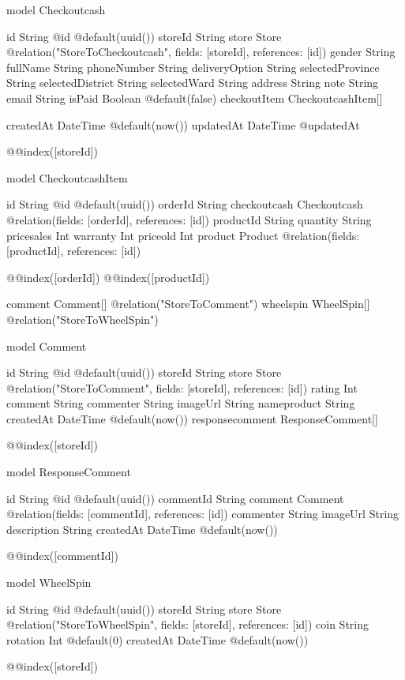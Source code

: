 model Checkoutcash {
  id               String             @id @default(uuid())
  storeId          String
  store            Store              @relation("StoreToCheckoutcash", fields: [storeId], references: [id])
  gender           String
  fullName         String
  phoneNumber      String
  deliveryOption   String
  selectedProvince String
  selectedDistrict String
  selectedWard     String
  address          String
  note             String
  email            String
  isPaid           Boolean            @default(false)
  checkoutItem     CheckoutcashItem[]

  createdAt DateTime @default(now())
  updatedAt DateTime @updatedAt

  @@index([storeId])
}

model CheckoutcashItem {
  id           String       @id @default(uuid())
  orderId      String
  checkoutcash Checkoutcash @relation(fields: [orderId], references: [id])
  productId    String
  quantity     String
  pricesales   Int
  warranty     Int
  priceold     Int
  product      Product      @relation(fields: [productId], references: [id])

  @@index([orderId])
  @@index([productId])
}



comment Comment[] @relation("StoreToComment")
wheelspin WheelSpin[] @relation("StoreToWheelSpin")





model Comment {
  id               String            @id @default(uuid())
  storeId         String
  store           Store         @relation("StoreToComment", fields: [storeId], references: [id])
  rating           Int
  comment          String
  commenter        String
  imageUrl         String
  nameproduct      String
  createdAt        DateTime          @default(now())
  responsecomment  ResponseComment[]

  @@index([storeId])
}

model ResponseComment {
  id          String   @id @default(uuid())
  commentId   String
  comment     Comment  @relation(fields: [commentId], references: [id])
  commenter   String
  imageUrl    String
  description String
  createdAt   DateTime @default(now())

  @@index([commentId])
}

model WheelSpin {
  id               String         @id @default(uuid())
  storeId         String
  store           Store         @relation("StoreToWheelSpin", fields: [storeId], references: [id])
  coin             String
  rotation         Int            @default(0)
  createdAt        DateTime       @default(now())

  @@index([storeId])
}








